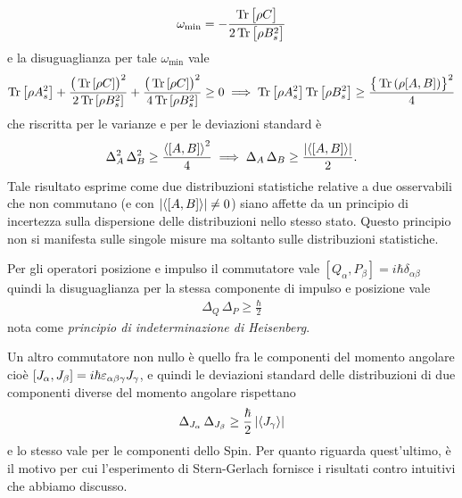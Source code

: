 \begin{align*}
  \omega_{\text{min}} = -\frac{\Tr\left[\phb \rho C \right]}{2\Tr\left[\phb  \rho B_s^2 \right]}
\end{align*}
e la disuguaglianza per tale $ \omega_{\text{min}} $ vale 
\begin{align*}
  \Tr\left[ \rho A_s^2 \right] + \frac{\left( \phb \Tr\left[ \rho C \right] \right)^2}{2 \Tr\left[ \rho B_s^2 \right]} 
  + \frac{\left(\phb \Tr\left[ \rho C \right] \right)^2}{4 \Tr\left[ \rho B_s^2 \right]} \geq 0 
  \implies \Tr\left[ \rho A_s^2 \right] \Tr\left[ \rho B_s^2 \right] \geq \frac{\left\{ \phb\Tr\left( \rho [A,B] \right) \right\}^2}4
\end{align*}
che riscritta per le varianze e per le deviazioni standard è
\begin{align*}
  \Delta_A^2 \, \Delta_B^2 \geq \frac{\left< [A,B] \right>^2}4 \implies \Delta_A \, \Delta_B \geq \frac{\left|{\left< [A,B] \right>}\right|}2.
\end{align*}
Tale risultato esprime come due distribuzioni statistiche relative a due osservabili che non commutano (e con $ \left|{\left< [A,B] \right>}\right| \neq 0 $) siano affette 
da un principio di incertezza sulla dispersione delle distribuzioni nello stesso stato. Questo principio non si manifesta sulle singole misure ma 
soltanto sulle distribuzioni statistiche. 

Per gli operatori posizione e impulso il commutatore vale $ [Q_\alpha, P_\beta] = i \hbar \delta_{\alpha \beta} $ quindi la disuguaglianza per 
la stessa componente di impulso e posizione vale 
\begin{align*}
  \Delta_Q \, \Delta_P \geq \frac\hbar2
\end{align*}
nota come \textit{principio di indeterminazione di Heisenberg}. 

Un altro commutatore non nullo è quello fra le componenti del momento angolare cioè $ [J_\alpha, J_\beta] = i \hbar \varepsilon_{\alpha \beta \gamma} J_\gamma $, 
e quindi le deviazioni standard delle distribuzioni di due componenti diverse del momento angolare rispettano 
\begin{align*}
  \Delta_{J_\alpha} \, \Delta_{J_\beta} \geq \frac\hbar2 \left|{\langle J_\gamma \rangle}\right|
\end{align*}
e lo stesso vale per le componenti dello Spin. Per quanto riguarda quest'ultimo, è il motivo per cui l'esperimento di Stern-Gerlach fornisce 
i risultati contro intuitivi che abbiamo discusso.

